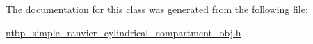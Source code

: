 The documentation for this class was generated from the following file:\begin{DoxyCompactItemize}
\item 
\hyperlink{ntbp__simple__ranvier__cylindrical__compartment__obj_8h}{ntbp\_\-simple\_\-ranvier\_\-cylindrical\_\-compartment\_\-obj.h}\end{DoxyCompactItemize}
